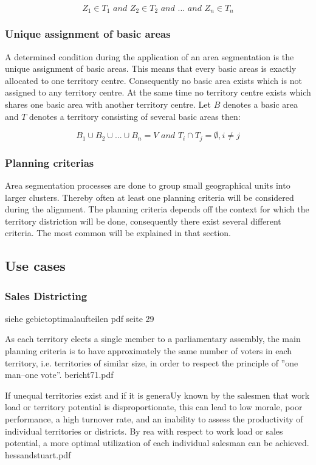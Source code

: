 \[ \mathit{Z_{1} \in T_{1} \text{ and } Z_{2} \in T_{2} \text{ and } ... \text{ and } Z_{n} \in T_{n}}\]

\subsubsection{Unique assignment of basic areas}
A determined condition during the application of an area segmentation is the unique assignment of basic areas. This means that every basic areas is exactly allocated to one territory centre. Consequently no basic area exists which is not assigned to any territory centre. At the same time no territory centre exists which shares one basic area with another territory centre. Let $ B $ denotes a basic area and $ T $ denotes a territory consisting of several basic areas then:

\[ \mathit{B_{1} \cup B_{2} \cup ... \cup B_{n}=V \text{ and } T_{i} \cap T_{j}  =\emptyset, i \neq j}\]


\subsubsection{Planning criterias}
Area segmentation processes are done to group small geographical units into larger clusters. Thereby often at least one planning criteria will be considered during the alignment. The planning criteria depends off the context for which the territory distriction will be done, consequently there exist several different criteria. The most common will be explained in that section.

\subsection{Use cases}

\subsubsection{Sales Districting}

siehe gebietoptimalaufteilen pdf seite 29

As each territory elects a single member to a parliamentary assembly, the main
planning criteria is to have approximately the same number of voters in each territory, i.e.
territories of similar size, in order to respect the principle of ”one man–one vote”. bericht71.pdf

If unequal territories exist and if it is generaUy known by the salesmen
that work load or territory potential is disproportionate, this can lead to low morale,
poor performance, a high turnover rate, and an inability to assess the productivity of
individual territories or districts. By rea%
with respect to work load or sales potential, a more optimal utilization of each individual
salesman can be achieved.
hessandstuart.pdf

